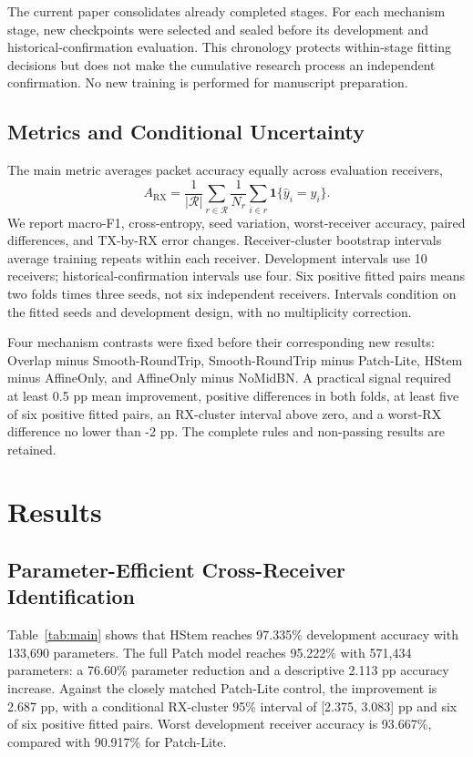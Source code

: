 \documentclass[journal]{IEEEtran}
\newcommand{\method}{HStem}
\begin{document}
The current paper consolidates already completed stages. For each mechanism stage, new checkpoints were selected and sealed before its development and historical-confirmation evaluation. This chronology protects within-stage fitting decisions but does not make the cumulative research process an independent confirmation. No new training is performed for manuscript preparation.

\subsection{Metrics and Conditional Uncertainty}
The main metric averages packet accuracy equally across evaluation receivers,
\begin{equation}
 A_{\mathrm{RX}}=\frac{1}{|\mathcal R|}\sum_{r\in\mathcal R}
 \frac{1}{N_r}\sum_{i\in r}\mathbf{1}\{\hat y_i=y_i\}.
\end{equation}
We report macro-F1, cross-entropy, seed variation, worst-receiver accuracy, paired differences, and TX-by-RX error changes. Receiver-cluster bootstrap intervals average training repeats within each receiver. Development intervals use 10 receivers; historical-confirmation intervals use four. Six positive fitted pairs means two folds times three seeds, not six independent receivers. Intervals condition on the fitted seeds and development design, with no multiplicity correction.

Four mechanism contrasts were fixed before their corresponding new results: Overlap minus Smooth-RoundTrip, Smooth-RoundTrip minus Patch-Lite, \method{} minus AffineOnly, and AffineOnly minus NoMidBN. A practical signal required at least 0.5 pp mean improvement, positive differences in both folds, at least five of six positive fitted pairs, an RX-cluster interval above zero, and a worst-RX difference no lower than -2 pp. The complete rules and non-passing results are retained.

\section{Results}
\subsection{Parameter-Efficient Cross-Receiver Identification}

Table~\ref{tab:main} shows that \method{} reaches 97.335\% development accuracy with 133,690 parameters. The full Patch model reaches 95.222\% with 571,434 parameters: a 76.60\% parameter reduction and a descriptive 2.113 pp accuracy increase. Against the closely matched Patch-Lite control, the improvement is 2.687 pp, with a conditional RX-cluster 95\% interval of [2.375, 3.083] pp and six of six positive fitted pairs. Worst development receiver accuracy is 93.667\%, compared with 90.917\% for Patch-Lite.
\end{document}
